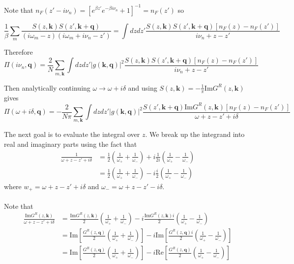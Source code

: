 \documentclass[]{article}
\newcommand{\kk}{\mathbf{k}}
\newcommand{\qq}{\mathbf{q}}
\newcommand{\iwm}{i\omega_m}
\newcommand{\gs}{\left| g(\mathbf{k}, \mathbf{q}) \right|^2}
\newcommand{\imG}{\mathrm{Im} G^R(z, \kk)}
\newcommand{\ivn}{i\nu_n}
\begin{document}
Note that $n_F(z'-\ivn) = [e^{\beta z'}e^{-\beta\ivn} + 1]^{-1} = n_F(z')$ so

\begin{equation}
\frac{1}{\beta} \sum_m \frac{S(z,\kk)S(z',\kk+\qq)}{(\iwm-z)(\iwm+\ivn-z')} = \int dz dz' \frac{S(z,\kk)S(z',\kk+\qq)\left[n_F(z)-n_F(z')\right]}{\ivn+z-z'}
\end{equation}

Therefore
\begin{equation}
\Pi(\ivn, \qq) = \frac{2}{N} \sum_{m,\kk} \int dz dz' \gs \frac{S(z, \kk) S(z', \kk+\qq)\left[n_F(z)-n_F(z')\right]}{\ivn+z-z'}
\end{equation}

Then analytically continuing $\omega \rightarrow \omega+i\delta$ and using $S(z,\kk) = -\frac{1}{\pi}\imG$ gives
\begin{equation}
\label{1}
\Pi(\omega+i\delta, \qq) = -\frac{2}{N \pi} \sum_{m,\kk} \int dz dz' \gs \frac{ S(z', \kk+\qq)\imG \left[n_F(z)-n_F(z')\right]}{\omega+z-z'+i\delta}
\end{equation}

The next goal is to evaluate the integral over $z$. We break up the integrand into real and imaginary parts using the fact that
\begin{equation}
\begin{split}
\frac{1}{\omega+z-z'+i\delta} & = \frac{1}{2}\left(\frac{1}{\omega_+} + \frac{1}{\omega_-} \right) + i \frac{1}{2i} \left( \frac{1}{\omega_+} - \frac{1}{\omega_-} \right) 
\\ &= \frac{1}{2}\left(\frac{1}{\omega_+} + \frac{1}{\omega_-} \right) - i \frac{i}{2} \left( \frac{1}{\omega_+} - \frac{1}{\omega_-} \right)
\end{split}
\end{equation}
where $w_+ = \omega+z-z'+i\delta$ and $\omega_- = \omega+z-z'-i\delta$.
\\
\\
Note that 
\begin{equation}
\begin{split}
\frac{\imG}{\omega+z-z'+i\delta} &= \frac{\imG}{2}\left(\frac{1}{\omega_+} + \frac{1}{\omega_-}\right) - i  \frac{\imG i}{2} \left(\frac{1}{\omega_+} - \frac{1}{\omega_-}\right) \\
&= \mathrm{Im}\left[  \frac{G^R(z,\qq)}{2}\left(\frac{1}{\omega_+} + \frac{1}{\omega_-} \right) \right] - i \mathrm{Im}\left[\frac{G^R(z,\qq)i}{2} \left( \frac{1}{\omega_+} - \frac{1}{\omega_-} \right) \right] \\
& = \mathrm{Im}\left[  \frac{G^R(z,\qq)}{2}\left(\frac{1}{\omega_+} + \frac{1}{\omega_-} \right) \right] - i \mathrm{Re}\left[\frac{G^R(z,\qq)}{2} \left( \frac{1}{\omega_+} - \frac{1}{\omega_-} \right) \right]
\end{split}
\end{equation}
\end{document}
